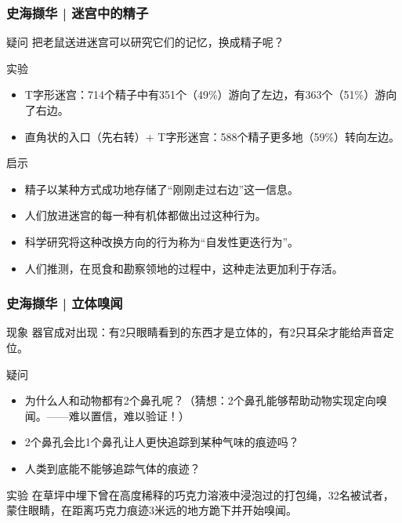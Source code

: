 \begin{frame}
  \frametitle{史海撷华 | 迷宫中的精子}
  \begin{block}{疑问}
    把老鼠送进迷宫可以研究它们的记忆，换成精子呢？
  \end{block}
  \pause
  \begin{block}{实验}
    \begin{itemize}
      \item T字形迷宫：714个精子中有351个（49\%）游向了左边，有363个（51\%）游向了右边。
      \item 直角状的入口（先右转）+ T字形迷宫：588个精子更多地（59\%）转向左边。
    \end{itemize}
  \end{block}
  \pause
  \begin{block}{启示}
    \begin{itemize}
      \item 精子以某种方式成功地存储了“刚刚走过右边”这一信息。
      \item 人们放进迷宫的每一种有机体都做出过这种行为。
      \item 科学研究将这种改换方向的行为称为“自发性更迭行为”。
      \item 人们推测，在觅食和勘察领地的过程中，这种走法更加利于存活。
    \end{itemize}
  \end{block}
\end{frame}

\begin{frame}
  \frametitle{史海撷华 | 立体嗅闻}
  \begin{block}{现象}
  器官成对出现：有2只眼睛看到的东西才是立体的，有2只耳朵才能给声音定位。
  \end{block}
  \pause
  \begin{block}{疑问}
    \begin{itemize}
      \item 为什么人和动物都有2个鼻孔呢？（猜想：2个鼻孔能够帮助动物实现定向嗅闻。——难以置信，难以验证！）
      \item 2个鼻孔会比1个鼻孔让人更快追踪到某种气味的痕迹吗？
      \item 人类到底能不能够追踪气体的痕迹？
    \end{itemize}
  \end{block}
  \pause
  \begin{block}{实验}
    在草坪中埋下曾在高度稀释的巧克力溶液中浸泡过的打包绳，32名被试者，蒙住眼睛，在距离巧克力痕迹3米远的地方跪下并开始嗅闻。
  \end{block}
\end{frame}

